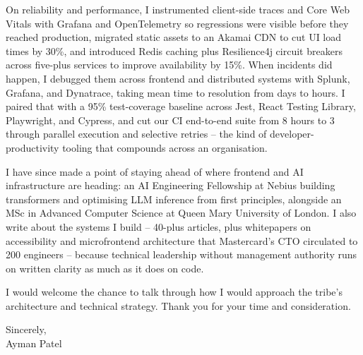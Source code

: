 \documentclass[a4paper,11pt]{article}
\begin{document}
On reliability and performance, I instrumented client-side traces and Core Web Vitals with Grafana and OpenTelemetry so regressions were visible before they reached production, migrated static assets to an Akamai CDN to cut UI load times by 30\%, and introduced Redis caching plus Resilience4j circuit breakers across five-plus services to improve availability by 15\%. When incidents did happen, I debugged them across frontend and distributed systems with Splunk, Grafana, and Dynatrace, taking mean time to resolution from days to hours. I paired that with a 95\% test-coverage baseline across Jest, React Testing Library, Playwright, and Cypress, and cut our CI end-to-end suite from 8 hours to 3 through parallel execution and selective retries -- the kind of developer-productivity tooling that compounds across an organisation.

I have since made a point of staying ahead of where frontend and AI infrastructure are heading: an AI Engineering Fellowship at Nebius building transformers and optimising LLM inference from first principles, alongside an MSc in Advanced Computer Science at Queen Mary University of London. I also write about the systems I build -- 40-plus articles, plus whitepapers on accessibility and microfrontend architecture that Mastercard's CTO circulated to 200 engineers -- because technical leadership without management authority runs on written clarity as much as it does on code.

I would welcome the chance to talk through how I would approach the tribe's architecture and technical strategy. Thank you for your time and consideration.

\vspace{6pt}
Sincerely,\\
Ayman Patel
\end{document}
